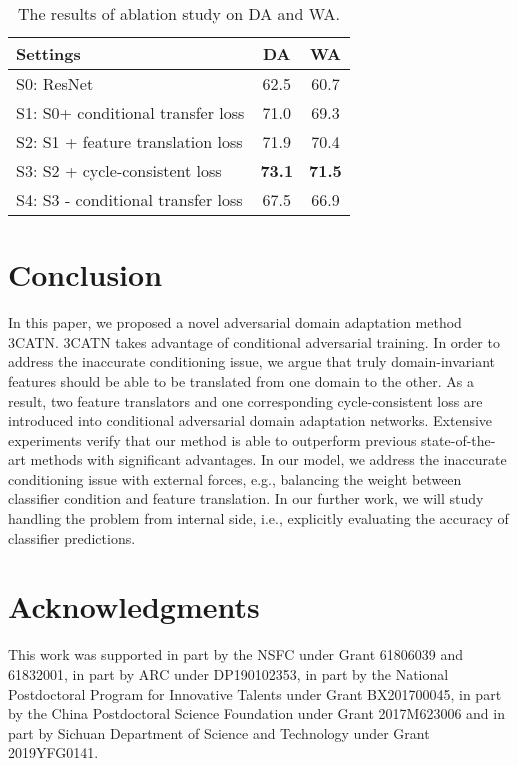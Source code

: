 \documentclass[sigconf]{acmart}
\begin{document}
\begin{table}[t!p]
\centering
\caption{The results of ablation study on DA and WA. }
\vspace{-5pt}
\label{tab:ablation}
\small \begin{tabular}{lcc}
\toprule
Settings & DA & WA  \\
\midrule
S0: ResNet  & 62.5 & 60.7   \\
S1: S0+ conditional transfer loss    & 71.0 & 69.3   \\
S2: S1 + feature translation loss & 71.9 & 70.4   \\
S3: S2 + cycle-consistent loss  & {\bf 73.1} & {\bf 71.5}  \\     
S4: S3 - conditional transfer loss   & 67.5 & 66.9  \\     
\bottomrule
\end{tabular}
\vspace{-10pt}
\end{table}

\section{Conclusion}
In this paper, we proposed a novel adversarial domain adaptation method 3CATN. 3CATN takes advantage of conditional adversarial training. In order to address the inaccurate conditioning issue, we argue that truly domain-invariant features should be able to be translated from one domain to the other. As a result, two feature translators and one corresponding cycle-consistent loss are introduced into conditional adversarial domain adaptation networks. Extensive experiments verify that our method is able to outperform previous state-of-the-art methods with significant advantages. In our model, we address the inaccurate conditioning issue with external forces, e.g., balancing the weight between classifier condition and feature translation. In our further work, we will study handling the problem from internal side, i.e., explicitly evaluating the accuracy of classifier predictions.

\section{Acknowledgments}
This work was supported in part by the NSFC under Grant 61806039 and 61832001, in part by ARC under DP190102353, in part by the National Postdoctoral Program for Innovative Talents under Grant BX201700045, in part by the China Postdoctoral Science Foundation under Grant 2017M623006 and in part by Sichuan Department of Science and Technology under Grant 2019YFG0141.



\balance


\end{document}
